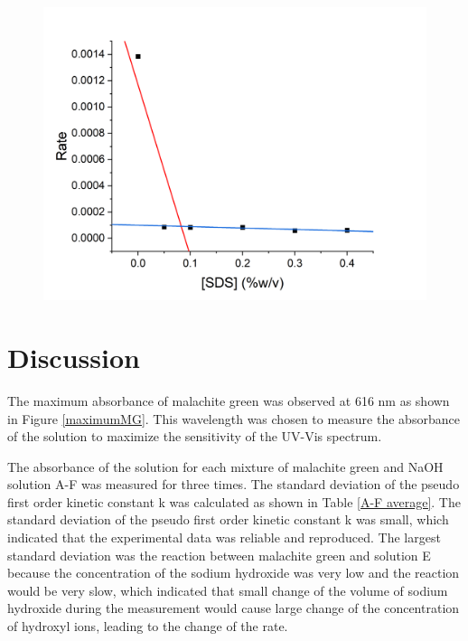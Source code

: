 \documentclass[twocolumn]{article} %
\begin{document}
\begin{figure}[H]
    \centering
    \includegraphics[width=\columnwidth]{CMC2 (1).png}
    \label{MGCMC}
\end{figure}


\section{Discussion}


The maximum absorbance of malachite green was observed at 616 nm as shown in Figure \ref{maximumMG}. This wavelength was chosen to measure the absorbance of the solution to maximize the sensitivity of the UV-Vis spectrum. 

The absorbance of the solution for each mixture of malachite green and NaOH solution A-F was measured for three times. The standard deviation  of the pseudo first order kinetic constant k was calculated as shown in Table \ref{A-F average}. The standard deviation of the pseudo first order kinetic constant k was small, which indicated that the experimental data was reliable and reproduced. The largest standard deviation was the reaction between malachite green and solution E because the concentration of the sodium hydroxide was very low and the reaction would be very slow, which indicated that small change of the volume of sodium hydroxide during the measurement would cause large change of the concentration of hydroxyl ions, leading to the change of the rate. 
\end{document}
